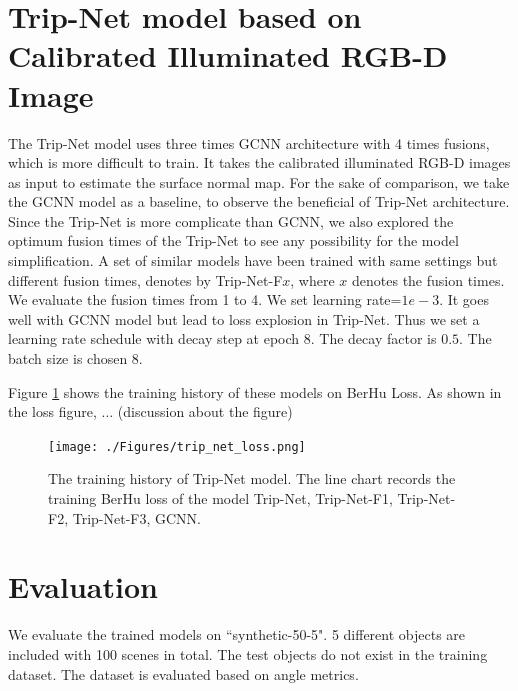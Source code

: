 \documentclass[border=15pt, multi, tikz]{article}
\begin{document}
\section{Trip-Net model based on Calibrated Illuminated RGB-D Image}
The Trip-Net model uses three times GCNN architecture with 4 times fusions, which is more difficult to train. It takes the calibrated illuminated RGB-D images as input to estimate the surface normal map. For the sake of comparison, we take the GCNN model as a baseline, to observe the beneficial of Trip-Net architecture. Since the Trip-Net is more complicate than GCNN, we also explored the optimum fusion times of the Trip-Net to see any possibility for the model simplification. A set of similar models have been trained with same settings but different fusion times, denotes by Trip-Net-F$ x $, where $ x $ denotes the fusion times. We evaluate the fusion times from 1 to 4. We set learning rate=$ 1e-3 $. It goes well with GCNN model but lead to loss explosion in Trip-Net. Thus we set a learning rate schedule with decay step at epoch 8. The decay factor is $ 0.5$. The batch size is chosen 8.

Figure \ref{fig:trip-net-training-history} shows the training history of these models on BerHu Loss. As shown in the loss figure, ... (discussion about the figure)

\begin{figure}[th]
	\centering
	\texttt{[image: ./Figures/trip\_net\_loss.png]}
	\caption{The training history of Trip-Net model. The line chart records the training BerHu loss of the model Trip-Net, Trip-Net-F1, Trip-Net-F2, Trip-Net-F3, GCNN.}
	\label{fig:trip-net-training-history}
\end{figure}


\section{Evaluation}
We evaluate the trained models on ``synthetic-50-5". 5 different objects are included with 100 scenes in total. The test objects do not exist in the training dataset. The dataset is evaluated based on angle metrics. 
\end{document}
